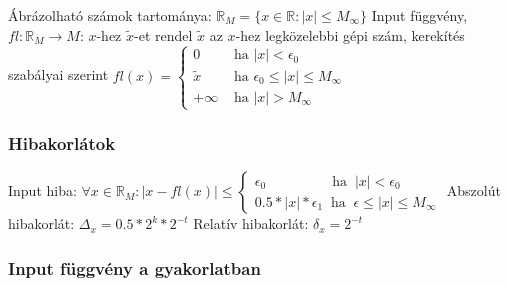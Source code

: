 \documentclass[12pt,a4paper]{article}
\begin{document}
\begin{outline}
	\1 Ábrázolható számok tartománya: $\mathbb{R}_M = \{x \in \mathbb{R}: |x| \le M_\infty\}$
	\1 Input függvény, $fl : \mathbb{R}_M \to M$: $x$-hez $\widetilde{x}$-et rendel
		\2 $\widetilde{x}$ az $x$-hez legközelebbi gépi szám, kerekítés szabályai szerint
		\2 $fl(x) = \begin{cases}
		0 &\text{ ha } |x| < \epsilon_0\\
		\widetilde{x} &\text{ ha } \epsilon_0 \le |x| \le M_\infty\\
		+\infty &\text{ ha } |x| > M_\infty
		\end{cases}$
\end{outline}

\subsubsection{Hibakorlátok}

\begin{outline}
	\1 Input hiba: $\forall x \in \mathbb{R}_M: |x-fl(x)| \le \begin{cases}
		\epsilon_0 \;\;\;\;\;\;\;\;\;\;\;\;\;\;\;\;\; \text{ha} \;\; |x| < \epsilon_0 \\
		0.5*|x|*\epsilon_1 \;\; \text{ha} \;\; \epsilon \le |x| \le M_\infty
	\end{cases}$
	\1 Abszolút hibakorlát: $\Delta_x = 0.5 * 2^k * 2^{-t}$
	\1 Relatív hibakorlát: $\delta_x = 2^{-t}$
\end{outline}

\pagebreak

\subsubsection{Input függvény a gyakorlatban}
\end{document}
